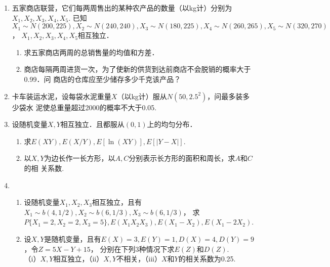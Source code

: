 \documentclass[10pt,a4paper]{article}
\begin{document}
\begin{enumerate}
    \item 五家商店联营，它们每两周售出的某种农产品的数量（以kg计）分别为$X_1,X_2,X_3,X_4,X_5$.
    已知$X_1\sim N(200,225),X_2\sim N(240,240),X_3\sim N(180,225),X_4\sim N(260,265),X_5\sim N(320,270)$，
    $X_1,X_2,X_3,X_4,X_5$相互独立．
    \begin{enumerate}
        \item 求五家商店两周的总销售量的均值和方差．
        \item 商店每隔两周进货一次，为了使新的供货到达前商店不会脱销的概率大于0.99．问
        商店的仓库应至少储存多少千克该产品？
    \end{enumerate}



    \item 卡车装运水泥，设每袋水泥重量$X$（以kg计）服从$N(50,2.5^2)$，问最多装多少袋水
    泥使总重量超过2000的概率不大于0.05.


    \item 设随机变量$X,Y$相互独立．且都服从$(0,1)$上的均匀分布．
    \begin{enumerate}
        \item 求$E(XY),E(X/Y),E[\ln (XY)],E[|Y-X|]$.
        \item 以$X,Y$为边长作一长方形，以$A,C$分别表示长方形的面积和周长，求$A$和$C$的相
        关系数.
    \end{enumerate}


    \item \begin{enumerate}
        \item 设随机变量$X_1,X_2,X_3$相互独立，且有$X_1\sim b(4,1/2),X_2\sim b(6,1/3),X_3\sim b(6,1/3)$，
        求$P\{X_1=2,X_2=2,X_3=5\},E(X_1X_2X_3),E(X_1-X_2),E(X_1-2X_2)$.
        \item 设$X,Y$是随机变量，且有$E(X)=3,E(Y)=1,D(X)=4,D(Y)=9$，令$Z=5X-Y+15$，
        分别在下列3种情况下求$E(Z)$和$D(Z)$.\\
        （i）$X,Y$相互独立，（ii）$X,Y$不相关，（iii）$X$和$Y$的相关系数为0.25.
    \end{enumerate}



\end{enumerate}
\end{document}
